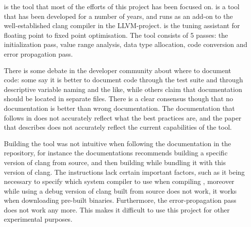 \taffo{} is the tool that most of the efforts of this project has been focused on. \taffo{} is a tool that has been developed for a number of years, and runs as an add-on to the well-established clang compiler in the LLVM-project.
\taffo{} is the tuning assistant for floating point to fixed point optimisation. The tool consists of 5 passes: the initialization pass, value range analysis, data type allocation, code conversion and error propagation pass.

There is some debate in the developer community about where to document code: some say it is better to document code through the test suite and through descriptive variable naming and the like, while others claim that documentation should be located in separate files. There is a clear consensus though that no documentation is better than wrong documentation.
The documentation that follows in \taffo{} does not accurately reflect what the best practices are, and the paper that describes \taffo{} does not accurately reflect the current capabilities of the tool.

Building the tool was not intuitive when following the documentation in the repository, for instance the documentations recommends building a specific version of clang from source, and then building \taffo{} while bundling it with this version of clang. The instructions lack certain important factors, such as it being necessary to specify which system compiler to use when compiling \taffo , moreover while using a debug version of clang built from source does not work, it works when downloading pre-built binaries.
Furthermore, the error-propagation pass does not work any more. This makes it difficult to use this project for other experimental purposes.

